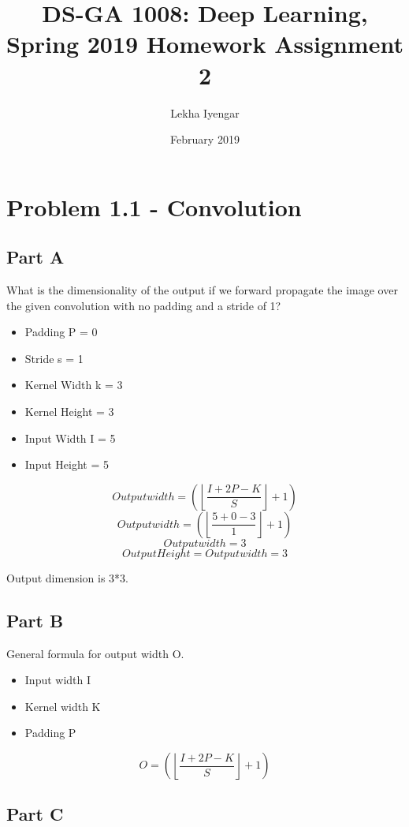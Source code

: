 \documentclass{article}
\title{DS-GA 1008: Deep Learning, Spring 2019
Homework Assignment 2}
\author{Lekha Iyengar}
\date{February 2019}
\begin{document}
\maketitle

\section*{Problem 1.1 - Convolution}

\subsection*{Part A}

What is the dimensionality of the output if we forward propagate the image over the given convolution with no padding and a stride of 1?

\begin{itemize}
    \item Padding P = 0
    \item Stride s = 1
    \item Kernel Width k = 3
    \item Kernel Height = 3
    \item Input Width I = 5
    \item Input Height = 5
\end{itemize}

\[
Output width = (\left \lfloor\frac{I + 2P - K }{S} \right \rfloor + 1)
\]
\[
Output width = (\left \lfloor\frac{5 + 0 - 3 }{1} \right \rfloor + 1)
\]
\[
Output width = 3
\]
\[Output Height = Output width = 3\]

Output dimension is 3*3. 

\subsection*{Part B}
General formula for output width O.

\begin{itemize}
    \item Input width I 
    \item Kernel width K 
    \item Padding P 
\end{itemize}

\[
O = (\left \lfloor\frac{I + 2P - K }{S} \right \rfloor + 1)
\]

\subsection*{Part C}
\end{document}
